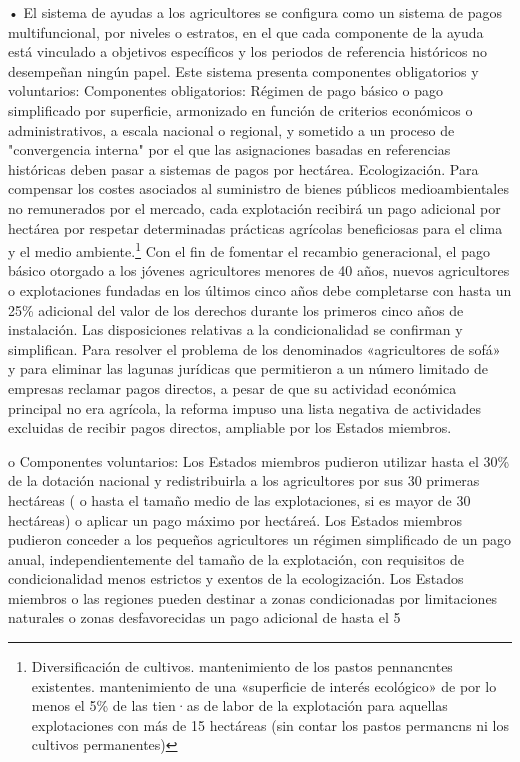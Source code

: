 \documentclass[10pt,a4paper]{article}
\begin{document}
• El sistema de ayudas a los agricultores se configura como un sistema de pagos multifuncional, por niveles o estratos, en el que cada componente de la ayuda está vinculado a objetivos específicos y los periodos de referencia históricos no desempeñan ningún papel. Este sistema presenta componentes obligatorios y voluntarios: 
    Componentes obligatorios: Régimen de pago básico o pago simplificado por superficie, armonizado en función de criterios económicos o administrativos, a escala nacional o regional, y sometido a un proceso de "convergencia interna" por el que las asignaciones basadas en referencias históricas deben pasar a sistemas de pagos por hectárea. Ecologización. Para compensar los costes asociados al suministro de bienes públicos medioambientales no remunerados por el mercado, cada explotación recibirá un pago adicional por hectárea por respetar determinadas prácticas agrícolas beneficiosas para el clima y el medio ambiente.\footnote{%
        Diversificación de cultivos. mantenimiento de los pastos pennancntes existentes. mantenimiento de una «superficie de interés ecológico» de por lo menos el 5\% de las tien·as de labor de la explotación para aquellas explotaciones con más de 15 hectáreas (sin contar los pastos permancns ni los cultivos permanentes)
    } Con el fin de fomentar el recambio generacional, el pago básico otorgado a los jóvenes agricultores menores de 40 años, nuevos agricultores o explotaciones fundadas en los últimos cinco años debe completarse con hasta un 25\% adicional del valor de los derechos durante los primeros cinco años de instalación. Las disposiciones relativas a la condicionalidad se confirman y simplifican. Para resolver el problema de los denominados «agricultores de sofá» y para eliminar las lagunas jurídicas que permitieron a un número limitado de empresas reclamar pagos directos, a pesar de que su actividad económica principal no era agrícola, la reforma impuso una lista negativa de actividades excluidas de recibir pagos directos, ampliable por los Estados miembros.

    o  Componentes voluntarios: Los Estados miembros pudieron utilizar hasta el 30\% de la dotación nacional y redistribuirla a los agricultores por sus 30 primeras hectáreas ( o hasta el tamaño medio de las explotaciones, si es mayor de 30 hectáreas) o aplicar un pago máximo  por hectáreá. Los Estados miembros pudieron conceder a los pequeños agricultores un régimen simplificado de un pago anual, independientemente del tamaño de la explotación, con requisitos de condicionalidad menos estrictos y exentos de la ecologización. Los Estados miembros o las regiones pueden destinar a zonas condicionadas por limitaciones naturales o zonas desfavorecidas un pago adicional de hasta el 5%
\end{document}
